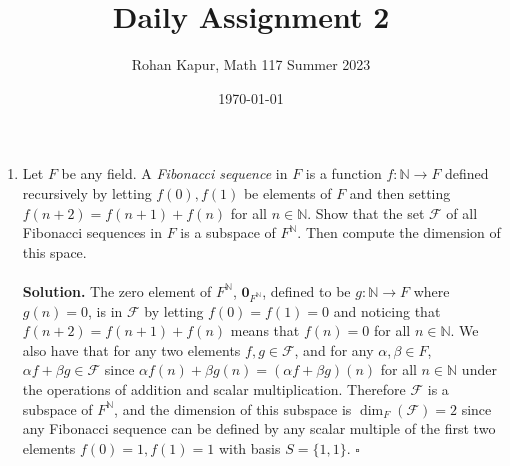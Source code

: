 \documentclass[11pt,twoside]{article}
\title{Daily Assignment 2}
\author{Rohan Kapur, Math 117 Summer 2023}
\date{\today}
\newcommand{\N}{\mathbb{N}}
\begin{document}
\maketitle

\begin{enumerate}
    \item Let $F$ be any field. A \textit{Fibonacci sequence} in $F$ is a function $ f: \N \rightarrow F $ defined recursively by letting $ f(0), f(1) $ be elements of $F$ and then setting $f(n+2)=f(n+1)+f(n)$ for all $n\in \N$. Show that the set $\mathcal{F}$ of all Fibonacci sequences in $F$ is a subspace of $F^\N$. Then compute the dimension of this space.
          \\\hbox{}\\
          \textbf{Solution.} The zero element of $F^\N$, $\mathbf{0}_{F^\N}$, defined to be $g:\N\rightarrow F$ where $g(n)=0$, is in $\mathcal{F}$ by letting $f(0)=f(1)=0$ and noticing that $f(n+2)=f(n+1)+f(n)$ means that $f(n)=0$ for all $n\in \N$. We also have that for any two elements $f, g\in \mathcal{F}$, and for any $\alpha, \beta\in F$, $\alpha{f} + \beta{g}\in \mathcal{F}$ since $\alpha{f(n)} + \beta{g(n)}=(\alpha{f} + \beta{g})(n)$ for all $n\in\N$ under the operations of addition and scalar multiplication. Therefore $\mathcal{F}$ is a subspace of $F^\N$, and the dimension of this subspace is $\dim_F(\mathcal{F})=2$ since any Fibonacci sequence can be defined by any scalar multiple of the first two elements $f(0)=1,f(1)=1$ with basis $S=\{1,1\}$. $\square$


\end{enumerate}
\end{document}
